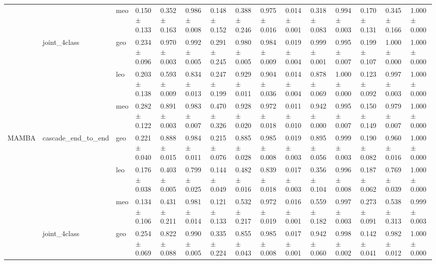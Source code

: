 \begin{table}
\begin{tabular}{lllllllllllllll}
            &              & meo &  0.150 $\pm$ 0.133 &  0.352 $\pm$ 0.163 &          0.986 $\pm$ 0.008 &  0.148 $\pm$ 0.152 &  0.388 $\pm$ 0.246 &          0.975 $\pm$ 0.016 &  0.014 $\pm$ 0.001 &  0.318 $\pm$ 0.083 &          0.994 $\pm$ 0.003 &  0.170 $\pm$ 0.131 &  0.345 $\pm$ 0.166 &          1.000 $\pm$ 0.000 \\
            & joint_4class & geo &  0.234 $\pm$ 0.096 &  0.970 $\pm$ 0.003 &          0.992 $\pm$ 0.005 &  0.291 $\pm$ 0.245 &  0.980 $\pm$ 0.005 &          0.984 $\pm$ 0.009 &  0.019 $\pm$ 0.004 &  0.999 $\pm$ 0.001 &          0.995 $\pm$ 0.007 &  0.199 $\pm$ 0.107 &  1.000 $\pm$ 0.000 &          1.000 $\pm$ 0.000 \\
            &              & leo &  0.203 $\pm$ 0.138 &  0.593 $\pm$ 0.009 &          0.834 $\pm$ 0.013 &  0.247 $\pm$ 0.199 &  0.929 $\pm$ 0.011 &          0.904 $\pm$ 0.036 &  0.014 $\pm$ 0.004 &  0.878 $\pm$ 0.069 &          1.000 $\pm$ 0.000 &  0.123 $\pm$ 0.092 &  0.997 $\pm$ 0.003 &          1.000 $\pm$ 0.000 \\
            &              & meo &  0.282 $\pm$ 0.122 &  0.891 $\pm$ 0.003 &          0.983 $\pm$ 0.007 &  0.470 $\pm$ 0.326 &  0.928 $\pm$ 0.020 &          0.972 $\pm$ 0.018 &  0.011 $\pm$ 0.010 &  0.942 $\pm$ 0.000 &          0.995 $\pm$ 0.007 &  0.150 $\pm$ 0.149 &  0.979 $\pm$ 0.007 &          1.000 $\pm$ 0.000 \\
MAMBA & cascade_end_to_end & geo &  0.221 $\pm$ 0.040 &  0.888 $\pm$ 0.015 &          0.984 $\pm$ 0.011 &  0.215 $\pm$ 0.076 &  0.885 $\pm$ 0.028 &          0.985 $\pm$ 0.008 &  0.019 $\pm$ 0.003 &  0.895 $\pm$ 0.056 &          0.999 $\pm$ 0.003 &  0.190 $\pm$ 0.082 &  0.960 $\pm$ 0.016 &          1.000 $\pm$ 0.000 \\
            &              & leo &  0.176 $\pm$ 0.038 &  0.403 $\pm$ 0.005 &          0.799 $\pm$ 0.025 &  0.144 $\pm$ 0.049 &  0.482 $\pm$ 0.016 &          0.839 $\pm$ 0.018 &  0.017 $\pm$ 0.003 &  0.356 $\pm$ 0.104 &          0.996 $\pm$ 0.008 &  0.187 $\pm$ 0.062 &  0.769 $\pm$ 0.039 &          1.000 $\pm$ 0.000 \\
            &              & meo &  0.134 $\pm$ 0.106 &  0.431 $\pm$ 0.211 &          0.981 $\pm$ 0.014 &  0.121 $\pm$ 0.133 &  0.532 $\pm$ 0.217 &          0.972 $\pm$ 0.019 &  0.016 $\pm$ 0.001 &  0.559 $\pm$ 0.182 &          0.997 $\pm$ 0.003 &  0.273 $\pm$ 0.091 &  0.538 $\pm$ 0.313 &          0.999 $\pm$ 0.003 \\
            & joint_4class & geo &  0.254 $\pm$ 0.069 &  0.822 $\pm$ 0.088 &          0.990 $\pm$ 0.005 &  0.335 $\pm$ 0.224 &  0.855 $\pm$ 0.043 &          0.985 $\pm$ 0.008 &  0.017 $\pm$ 0.001 &  0.942 $\pm$ 0.060 &          0.998 $\pm$ 0.002 &  0.142 $\pm$ 0.041 &  0.982 $\pm$ 0.012 &          1.000 $\pm$ 0.000 \\

\end{tabular}
\end{table}
